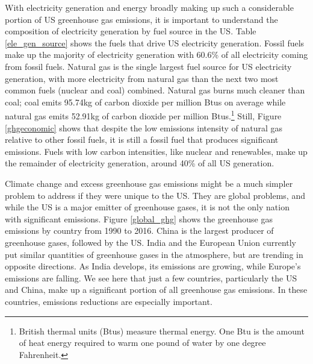 With electricity generation and energy broadly making up such a considerable portion of US greenhouse gas emissions, it is important to understand the composition of electricity generation by fuel source in the US. Table \ref{ele_gen_source} shows the fuels that drive US electricity generation. Fossil fuels make up the majority of electricity generation with 60.6\% of all electricity coming from fossil fuels. Natural gas is the single largest fuel source for US electricity generation, with more electricity from natural gas than the next two most common fuels (nuclear and coal) combined. Natural gas burns much cleaner than coal; coal emits 95.74kg of carbon dioxide per million Btus on average while natural gas emits 52.91kg of carbon dioxide per million Btus.\footnote{British thermal units (Btus) measure thermal energy. One Btu is the amount of heat energy required to warm one pound of water by one degree Fahrenheit.} Still, Figure \ref{ghgeconomic} shows that despite the low emissions intensity of natural gas relative to other fossil fuels, it is still a fossil fuel that produces significant emissions. Fuels with low carbon intensities, like nuclear and renewables, make up the remainder of electricity generation, around 40\% of all US generation.

Climate change and excess greenhouse gas emissions might be a much simpler problem to address if they were unique to the US. They are global problems, and while the US is a major emitter of greenhouse gases, it is not the only nation with significant emissions. Figure \ref{global_ghg} shows the greenhouse gas emissions by country from 1990 to 2016. China is the largest producer of greenhouse gases, followed by the US. India and the European Union currently put similar quantities of greenhouse gases in the atmosphere, but are trending in opposite directions. As India develops, its emissions are growing, while Europe's emissions are falling. We see here that just a few countries, particularly the US and China, make up a significant portion of all greenhouse gas emissions. In these countries, emissions reductions are especially important. 

